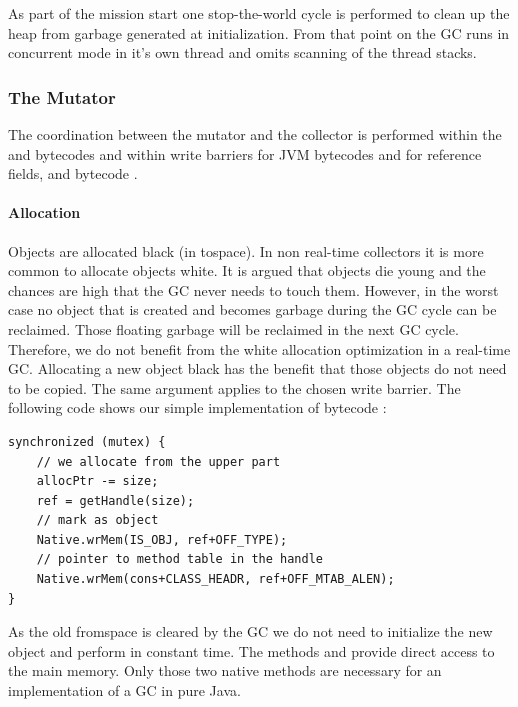 As part of the mission start one stop-the-world cycle is performed
to clean up the heap from garbage generated at initialization. From
that point on the GC runs in concurrent mode in it's own thread and
omits scanning of the thread stacks.

\subsubsection{The Mutator}

The coordination between the mutator and the collector is performed
within the  and  bytecodes and within write
barriers for JVM bytecodes  and  for
reference fields, and bytecode .

\paragraph{Allocation}

Objects are allocated black (in tospace). In non real-time
collectors it is more common to allocate objects white. It is argued
\cite{gc:dijkstra78} that objects die young and the chances are high
that the GC never needs to touch them. However, in the worst case no
object that is created and becomes garbage during the GC cycle can
be reclaimed. Those floating garbage will be reclaimed in the next
GC cycle. Therefore, we do not benefit from the white allocation
optimization in a real-time GC. Allocating a new object black has
the benefit that those objects do not need to be copied. The same
argument applies to the chosen write barrier. The following code
shows our simple implementation of bytecode :

\begin{samepage}
{\small
\begin{verbatim}
synchronized (mutex) {
    // we allocate from the upper part
    allocPtr -= size;
    ref = getHandle(size);
    // mark as object
    Native.wrMem(IS_OBJ, ref+OFF_TYPE);
    // pointer to method table in the handle
    Native.wrMem(cons+CLASS_HEADR, ref+OFF_MTAB_ALEN);
}
\end{verbatim}
}
\end{samepage}

As the old fromspace is cleared by the GC we do not need to
initialize the new object and perform  in constant time.
The methods  and  provide
direct access to the main memory. Only those two native methods are
necessary for an implementation of a GC in pure Java.


